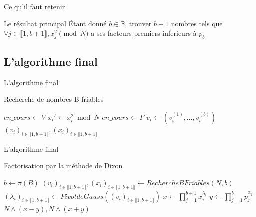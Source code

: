 \documentclass{beamer}
\begin{document}
\begin{frame}{Ce qu'il faut retenir}
    \begingroup
    \begin{block}{Le résultat principal}
        Étant donné $b\in \mathbb B$, trouver $b+1$ nombres tels que $\forall j\in\llbracket 1, b+1\rrbracket, x_j^2 \pmod N$ a ses facteurs premiers inferieurs à $p_b$
    \end{block}
    \endgroup
\end{frame}

\subsection{L'algorithme final}

\begin{frame}{L'algorithme final}
    \begin{algorithm}[H]
    \caption{Recherche de nombres B-friables}
    \small
    \begin{algorithmic}[1]
        \Statex
            \State $en\_cours \gets V$
                \State $x_i' \gets x_i^2 \bmod N$
                    \State $en\_cours \gets F$
                    \State $v_i \gets (v_i^{(1)}, \dots, v_i^{(b)})$
                \EndIf
            \EndWhile
        \EndFor
        \Statex
        \Return $(v_i)_{i \in \llbracket 1,b+1 \rrbracket}, (x_i)_{i \in \llbracket 1,b+1 \rrbracket}$
    \end{algorithmic}
    \end{algorithm}
\end{frame}

\begin{frame}{L'algorithme final}
    \begin{algorithm}[H]
    \caption{Factorisation par la méthode de Dixon}
    \begin{algorithmic}[1]
        \Statex
        \State $b \gets\pi(B)$
        \State $(v_i)_{i \in \llbracket 1,b+1 \rrbracket}, (x_i)_{i \in \llbracket 1,b+1 \rrbracket} \gets Recherche BFriables(N, b)$
        \State $(\lambda_i)_{i \in \llbracket 1,b+1 \rrbracket} \gets PivotdeGauss((v_i)_{i \in \llbracket 1,b+1 \rrbracket})$
        \State $x \gets \prod_{j=1}^{b+1}x_i^{\lambda_i}$
        \State $y \gets \prod_{j=1}^b p_j^{\alpha_j}$
        \Statex
        \Return $N \land(x-y), N\land(x+y)$
    \end{algorithmic}
    \end{algorithm}
\end{frame}
\end{document}
